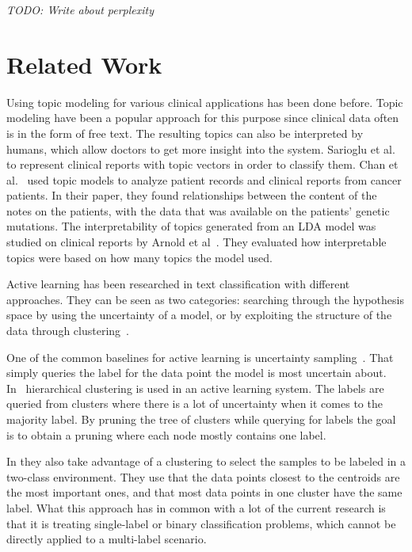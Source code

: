 \textit{TODO: Write about perplexity}
\section{Related Work}

Using topic modeling for various clinical applications has been done before.
Topic modeling have been a popular approach for this purpose since clinical data often is in the form of free text.
The resulting topics can also be interpreted by humans, which allow doctors to get more insight into the system.
Sarioglu et al\@.~\cite{sarioglu2013topic} to represent clinical reports with topic vectors in order to classify them.
Chan et al\@.~\cite{chan2013empirical} used topic models to analyze patient records and clinical reports from cancer patients.
In their paper, they found relationships between the content of the notes on the patients, with the data that was available on the patients' genetic mutations.
The interpretability of topics generated from an LDA model was studied on clinical reports by Arnold et al~\cite{arnold2016evaluating}.
They evaluated how interpretable topics were based on how many topics the model used.

Active learning has been researched in text classification with different approaches.
They can be seen as two categories: searching through the hypothesis space by using the uncertainty of a model, or by exploiting the structure of the data through clustering~\cite{dasgupta2008hierarchical}.

One of the common baselines for active learning is uncertainty sampling~\cite{lewis1994sequential}.
That simply queries the label for the data point the model is most uncertain about.
In~\cite{dasgupta2008hierarchical} hierarchical clustering is used in an active learning system.
The labels are queried from clusters where there is a lot of uncertainty when it comes to the majority label.
By pruning the tree of clusters while querying for labels the goal is to obtain a pruning where each node mostly contains one label.

In \cite{nguyen2004active} they also take advantage of a clustering to select the samples to be labeled in a two-class environment.
They use that the data points closest to the centroids are the most important ones, and that most data points in one cluster have the same label.
What this approach has in common with a lot of the current research is that it is treating single-label or binary classification problems, which cannot be directly applied to a multi-label scenario.

